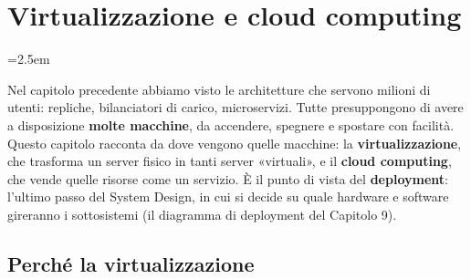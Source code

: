 \chapter{Virtualizzazione e cloud computing}
\emergencystretch=2.5em

Nel capitolo precedente abbiamo visto le architetture che servono milioni di utenti: repliche, bilanciatori di carico,
microservizi. Tutte presuppongono di avere a disposizione \textbf{molte macchine}, da accendere, spegnere e spostare con
facilità. Questo capitolo racconta da dove vengono quelle macchine: la \textbf{virtualizzazione}, che trasforma un server
fisico in tanti server «virtuali», e il \textbf{cloud computing}, che vende quelle risorse come un servizio. È il punto di
vista del \textbf{deployment}: l'ultimo passo del System Design, in cui si decide su quale hardware e software gireranno
i sottosistemi (il diagramma di deployment del Capitolo 9).

\newcommand{\torre}[3]{%
  \begin{scope}[shift={#1}]
    \draw[line width=0.6pt, draw=swgray!80!black, fill=swlight] (-0.3,-0.42) rectangle (0.3,0.42);
    \foreach \yy in {0.28,0.17,0.06} \draw[swgray, line width=0.5pt] (-0.2,\yy) -- (0.2,\yy);
    \fill[swgreen] (0.17,-0.3) circle (0.04);
    \node[font=\tiny, anchor=north, align=center] at (0,-0.44) {#3};
  \end{scope}
  \coordinate (#2) at #1;}

\section{Perché la virtualizzazione}


